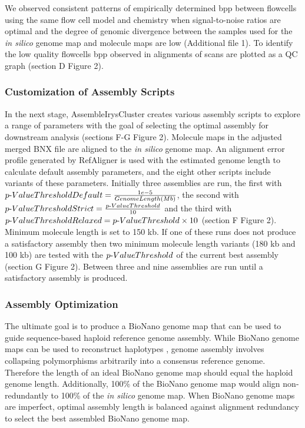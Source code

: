 \documentclass{bmcart}
\begin{document}
We observed consistent patterns of empirically determined bpp between flowcells using the same flow cell model and chemistry when signal-to-noise ratios are optimal and the degree of genomic divergence between the samples used for the \textit{in silico} genome map and molecule maps are low (Additional file 1). To identify the low quality flowcells bpp observed in alignments of scans are plotted as a QC graph (section D Figure 2). 

\subsubsection*{Customization of Assembly Scripts}

In the next stage, AssembleIrysCluster creates various assembly scripts to explore a range of parameters with the goal of selecting the optimal assembly for downstream analysis (sections F-G Figure 2). Molecule maps in the adjusted merged BNX file are aligned to the \textit{in silico} genome map. An alignment error profile generated by RefAligner is used with the estimated genome length to calculate default assembly parameters, and the eight other scripts include variants of these parameters. Initially three assemblies are run, the first with $p\textnormal{-}Value Threshold Default = \frac{1e-5}{Genome Length (Mb)}$, the second with  $p\textnormal{-}Value Threshold Strict = \frac{p\textnormal{-}Value Threshold}{10}$ and the third with $p\textnormal{-}Value Threshold Relaxed = {p\textnormal{-}Value Threshold} \times {10}$ (section F Figure 2). Minimum molecule length is set to 150 kb. If one of these runs does not produce a satisfactory assembly then two minimum molecule length variants (180 kb and 100 kb) are tested with the $p\textnormal{-}Value Threshold$ of the current best assembly (section G Figure 2). Between three and nine assemblies are run until a satisfactory assembly is produced.

\subsubsection*{Assembly Optimization}

The ultimate goal is to produce a BioNano genome map that can be used to guide sequence-based haploid reference genome assembly. While BioNano genome maps can be used to reconstruct haplotypes \cite{MHCLam}, genome assembly involves collapsing polymorphisms arbitrarily into a consensus reference genome. Therefore the length of an ideal BioNano genome map should equal the haploid genome length. Additionally, 100\% of the BioNano genome map would align non-redundantly to 100\% of the \textit{in silico} genome map. When BioNano genome maps are imperfect, optimal assembly length is balanced against alignment redundancy to select the best assembled BioNano genome map.
\end{document}

